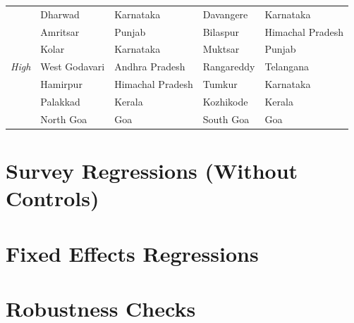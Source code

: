 \documentclass{article}        %
\begin{document}
\begin{longtable}{@{}p{2.8cm}p{3.2cm}p{3.2cm}p{3.2cm}p{3.2cm}@{}}
\multirow{7}{*}{\textit{High}}
  & Dharwad        & Karnataka           & Davangere        & Karnataka          \\
  & Amritsar       & Punjab              & Bilaspur         & Himachal Pradesh   \\
  & Kolar          & Karnataka           & Muktsar          & Punjab             \\
  & West Godavari  & Andhra Pradesh      & Rangareddy       & Telangana          \\
  & Hamirpur       & Himachal Pradesh    & Tumkur           & Karnataka          \\
  & Palakkad       & Kerala              & Kozhikode        & Kerala             \\
  & North Goa      & Goa                 & South Goa        & Goa                \\

\bottomrule
\end{longtable}

\newpage
\section{Survey Regressions (Without Controls)}


\newpage
\section{Fixed Effects Regressions}


\newpage
\section{Robustness Checks}

\end{document}
